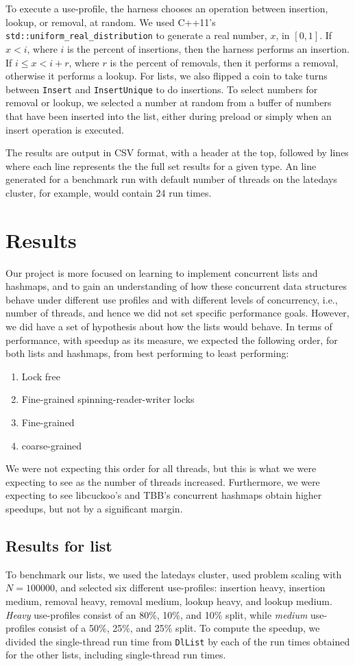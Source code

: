 \documentclass[11pt]{article}
\begin{document}
To execute a use-profile, the harness chooses an operation between insertion,
lookup, or removal, at random. We used C++11's {\tt
std::uniform\_real\_distribution} to generate a real number, $x$, in $[0,1]$. If
$x < i$, where $i$ is the percent of insertions, then the harness performs an
insertion. If $i \le x < i + r$, where $r$ is the percent of removals, then it
performs a removal, otherwise it performs a lookup. For lists, we also flipped a
coin to take turns between {\tt Insert} and {\tt InsertUnique} to do insertions.
To select numbers for removal or lookup, we selected a number at random from a
buffer of numbers that have been inserted into the list, either during preload
or simply when an insert operation is executed.

The results are output in CSV format, with a header at the top, followed by
lines where each line represents the the full set results for a given type. An
line generated for a benchmark run with default number of threads on the
latedays cluster, for example, would contain 24 run times.

\section{Results}
Our project is more focused on learning to implement concurrent lists and
hashmaps, and to gain an understanding of how these concurrent data structures
behave under different use profiles and with different levels of concurrency,
i.e., number of threads, and hence we did not set specific performance goals.
However, we did have a set of hypothesis about how the lists would behave. In
terms of performance, with speedup as its measure, we expected the following
order, for both lists and hashmaps, from best performing to least performing:

\begin{enumerate}
\item Lock free
\item Fine-grained spinning-reader-writer locks
\item Fine-grained
\item coarse-grained
\end{enumerate}

We were not expecting this order for all threads, but this is what we were
expecting to see as the number of threads increased. Furthermore, we were
expecting to see libcuckoo's and TBB's concurrent hashmaps obtain higher
speedups, but not by a significant margin.

\subsection{Results for list}
To benchmark our lists, we used the latedays cluster, used problem scaling with
$N=100000$, and selected six different use-profiles: insertion heavy, insertion
medium, removal heavy, removal medium, lookup heavy, and lookup medium. {\it
Heavy} use-profiles consist of an 80\%, 10\%, and 10\% split, while {\it
medium} use-profiles consist of a 50\%, 25\%, and 25\% split. To compute the
speedup, we divided the single-thread run time from {\tt DlList} by each of the
run times obtained for the other lists, including single-thread run times.
\end{document}
